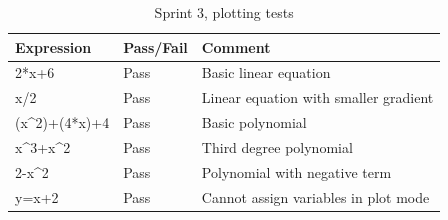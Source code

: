 \documentclass[a4paper, oneside, 11pt]{report}
\begin{document}
\newpage

\begin{table}[h]
\caption{Sprint 3, plotting tests}
\label{sprint3-plotting-test}
\begin{tabular}{|l|l|l|}
\hline
\textbf{Expression} & \textbf{Pass/Fail} & \textbf{Comment}                                                                     \\ \hline
2*x+6               & Pass               & Basic linear equation                                                                \\ \hline
x/2                 & Pass               & Linear equation with smaller gradient                                                \\ \hline
(x\^{}2)+(4*x)+4    & Pass               & Basic polynomial                                                                     \\ \hline
x\^{}3+x\^{}2       & Pass               & Third degree polynomial                                                             \\ \hline
2-x\^{}2            & Pass               & Polynomial with negative term                                                       \\ \hline
y=x+2               & Pass               & Cannot assign variables in plot mode                                                \\ \hline
\end{tabular}
\end{table}

\newpage
\end{document}
